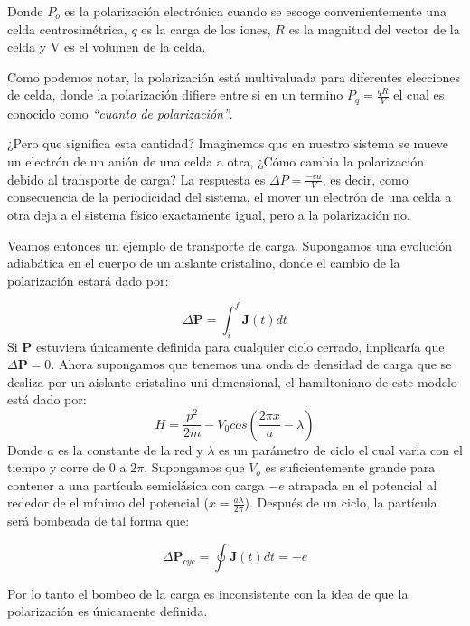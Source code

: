 Donde $P_o$ es la polarización electrónica cuando se escoge convenientemente una celda centrosimétrica, $q$ es la carga de los iones, $R$ es la magnitud del vector de la celda y V es el volumen de la celda.

Como podemos notar, la polarización está multivaluada para diferentes elecciones de celda, donde la polarización difiere entre si en un termino $P_q = \frac{qR}{V}$ el cual es conocido como \textit{``cuanto de polarización''}.

¿Pero que significa esta cantidad? Imaginemos que en nuestro sistema se mueve un electrón de un anión de una celda a otra, ¿Cómo cambia la polarización debido al transporte de carga? La respuesta es $\Delta P = \frac{-ea}{V}$, es decir, como consecuencia de la periodicidad del sistema, el mover un electrón de una celda a otra deja a el sistema físico exactamente igual, pero a la polarización no.

Veamos entonces un ejemplo de transporte de carga. Supongamos una evolución adiabática en el cuerpo de un aislante cristalino, donde el cambio de la polarización estará dado por:

\begin{equation}
    \Delta \textbf{P} = \int_i^f \textbf{J}(t)dt
\end{equation}
Si \textbf{P} estuviera únicamente definida para cualquier ciclo cerrado, implicaría que  $\Delta \textbf{P} = 0$. Ahora supongamos que tenemos una onda de densidad de carga que se desliza por un aislante cristalino uni-dimensional, el hamiltoniano de este modelo está dado por:
\begin{equation}
    H =  \frac{p^2}{2m} - V_0 cos(\frac{2\pi x}{a} - \lambda)
\end{equation}
Donde $a$ es la constante de la red y $\lambda$ es un parámetro de ciclo el cual varia con el tiempo y corre de $0$ a $2\pi$. 
Supongamos que $V_o$ es suficientemente grande para contener a una partícula semiclásica con carga $-e$ atrapada en el potencial al rededor de el mínimo del potencial ($x = \frac{a\lambda}{2\pi}$). Después de un ciclo, la partícula será bombeada de tal forma que:

\begin{equation}
    \Delta \textbf{P}_{cyc} = \oint \textbf{J}(t)dt = -e
\end{equation}

Por lo tanto el bombeo de la carga es inconsistente con la idea de que la polarización es únicamente  definida. 

